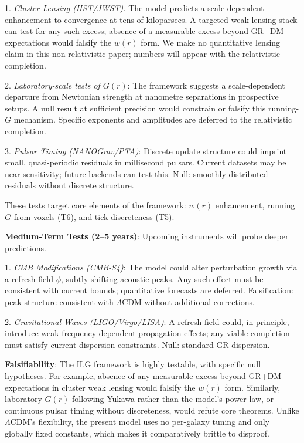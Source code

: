 \documentclass[usenatbib]{mnras}
\begin{document}
1. \emph{Cluster Lensing (HST/JWST).} The model predicts a scale-dependent enhancement to convergence at tens of kiloparsecs. A targeted weak-lensing stack can test for any such excess; absence of a measurable excess beyond GR+DM expectations would falsify the $w(r)$ form. We make no quantitative lensing claim in this non-relativistic paper; numbers will appear with the relativistic completion.

2. \emph{Laboratory-scale tests of $G(r)$}: The framework suggests a scale-dependent departure from Newtonian strength at nanometre separations in prospective setups. A null result at sufficient precision would constrain or falsify this running-$G$ mechanism. Specific exponents and amplitudes are deferred to the relativistic completion.

3. \emph{Pulsar Timing (NANOGrav/PTA)}: Discrete update structure could imprint small, quasi-periodic residuals in millisecond pulsars. Current datasets may be near sensitivity; future backends can test this. Null: smoothly distributed residuals without discrete structure.

These tests target core elements of the framework: $w(r)$ enhancement, running $G$ from voxels (T6), and tick discreteness (T5).

\textbf{Medium-Term Tests (2--5 years)}: Upcoming instruments will probe deeper predictions.

1. \emph{CMB Modifications (CMB-S4)}: The model could alter perturbation growth via a refresh field $\phi$, subtly shifting acoustic peaks. Any such effect must be consistent with current bounds; quantitative forecasts are deferred. Falsification: peak structure consistent with $\Lambda$CDM without additional corrections.

2. \emph{Gravitational Waves (LIGO/Virgo/LISA)}: A refresh field could, in principle, introduce weak frequency-dependent propagation effects; any viable completion must satisfy current dispersion constraints. Null: standard GR dispersion.

\textbf{Falsifiability}: The ILG framework is highly testable, with specific null hypotheses. For example, absence of any measurable excess beyond GR+DM expectations in cluster weak lensing would falsify the $w(r)$ form. Similarly, laboratory $G(r)$ following Yukawa rather than the model's power-law, or continuous pulsar timing without discreteness, would refute core theorems. Unlike $\Lambda$CDM's flexibility, the present model uses no per-galaxy tuning and only globally fixed constants, which makes it comparatively brittle to disproof.
\end{document}
